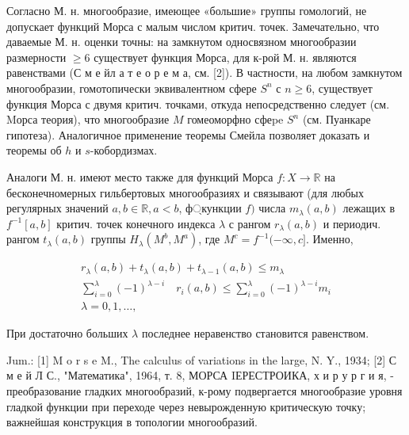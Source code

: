\documentclass[10pt]{article}
\begin{document}
Согласно М. н. многообразие, имеющее «большие» группы гомологий, не допускает функций Морса с малым числом критич. точек. Замечательно, что даваемые М. н. оценки точны: на замкнутом односвязном многообразии размерности $\geqslant 6$ существует функция Морса, для к-рой М. н. являются равенствами (С м е йл а т е о р е м а, см. [2]). В частности, на любом замкнутом многообразии, гомотопически эквивалентном сфере $S^{n}$ с $n \geqslant 6$, существует функция Морса с двумя критич. точками, откуда непосредственно следует (см. Mорса теория), что многообразие $M$ гомеоморфно сфеpe $S^{n}$ (см. Пуанкаре гипотеза). Аналогичное применение теоремы Смейла позволяет доказать и теоремы об $h$ и $s$-кобордизмах.



Аналоги М. н. имеют место также для функций Морса $f: X \rightarrow \mathbb{R}$ на бесконечномерных гильбертовых многообразиях и связывают (для любых регулярных значений $a, b \in \mathbb{R}, a<b$, ф্кункции $f)$ числа $m_{\lambda}(a, b)$ лежащих в $f^{-1}[a, b]$ критич. точек конечного индекса $\lambda$ с рангом $r_{\lambda}(a, b)$ и периодич. рангом $t_{\lambda}(a, b)$ группы $H_{\lambda}\left(M^{b}, M^{a}\right)$, где $M^{c}=f^{-1}(-\infty, c]$. Именно,



\[

\begin{gathered}

r_{\lambda}(a, b)+t_{\lambda}(a, b)+t_{\lambda-1}(a, b) \leqslant m_{\lambda} \\

\sum_{i=0}^{\lambda}(-1)^{\lambda-i} \quad r_{i}(a, b) \leqslant \sum_{i=0}^{\lambda}(-1)^{\lambda-i} m_{i} \\

\lambda=0,1, \ldots,

\end{gathered}

\]



При достаточно больших $\lambda$ последнее неравенство становится равенством.



Jum.: [1] M o r s e M., The calculus of variations in the large, N. Y., 1934; [2] С м е й Л С., "Математика", 1964, т. 8, МОРСА IЕРЕСТРОИКА, х и р у р г и я, - преобразование гладких многообразий, к-рому подвергается многообразие уровня гладкой функции при переходе через невырожденную критическую точку; важнейшая конструкция в топологии многообразий.
\end{document}
